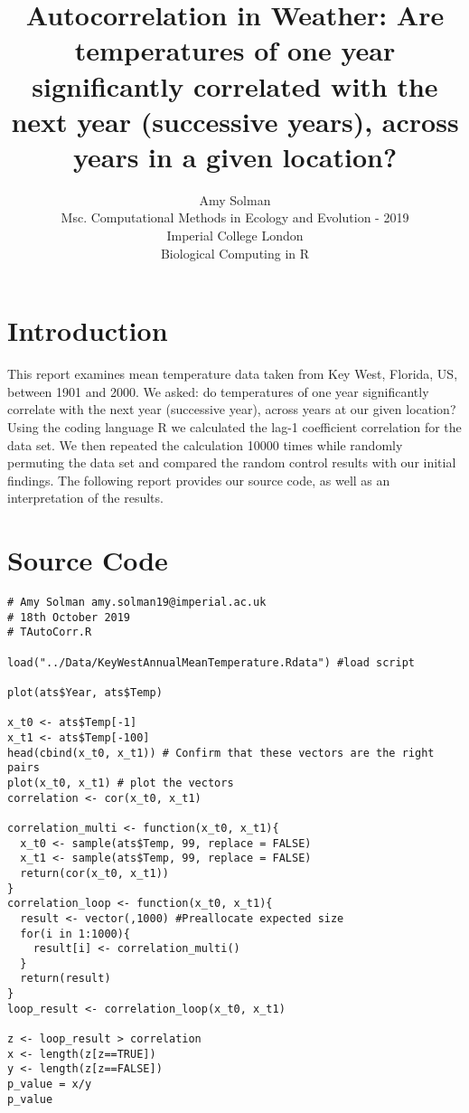 \documentclass[final,3p]{CSP}
\begin{document}
\begin{frontmatter}

\title{Autocorrelation in Weather: Are temperatures of one year significantly correlated with the next year (successive years), across years in a given location?}

\author{Amy Solman \\%
Msc. Computational Methods in Ecology and Evolution - 2019\\
Imperial College London\\
Biological Computing in R}


\end{frontmatter}

\section{Introduction}
\label{}
\noindent
This report examines mean temperature data taken from Key West, Florida, US, between 1901 and 2000. We asked: do temperatures of one year significantly correlate with the next year (successive year), across years at our given location? Using the coding language R we calculated the lag-1 coefficient correlation for the data set. We then repeated the calculation 10000 times while randomly permuting the data set and compared the random control results with our initial findings. The following report provides our source code, as well as an interpretation of the results.

\section{Source Code}
\begin{verbatim}
# Amy Solman amy.solman19@imperial.ac.uk
# 18th October 2019
# TAutoCorr.R

load("../Data/KeyWestAnnualMeanTemperature.Rdata") #load script

plot(ats$Year, ats$Temp) 

x_t0 <- ats$Temp[-1]
x_t1 <- ats$Temp[-100]
head(cbind(x_t0, x_t1)) # Confirm that these vectors are the right pairs
plot(x_t0, x_t1) # plot the vectors
correlation <- cor(x_t0, x_t1)

correlation_multi <- function(x_t0, x_t1){ 
  x_t0 <- sample(ats$Temp, 99, replace = FALSE)
  x_t1 <- sample(ats$Temp, 99, replace = FALSE)
  return(cor(x_t0, x_t1))
}
correlation_loop <- function(x_t0, x_t1){
  result <- vector(,1000) #Preallocate expected size
  for(i in 1:1000){
    result[i] <- correlation_multi()
  }
  return(result)
}
loop_result <- correlation_loop(x_t0, x_t1)

z <- loop_result > correlation 
x <- length(z[z==TRUE])
y <- length(z[z==FALSE])
p_value = x/y
p_value 
\end{verbatim}
\end{document}
